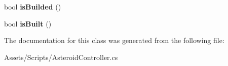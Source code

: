 \begin{DoxyCompactItemize}
\item 
\hypertarget{class_asteroid_controller_1_1_building_a90bee73e6b062d0fb2b78dd2a15725d6}{}bool {\bfseries is\+Builded} ()\label{class_asteroid_controller_1_1_building_a90bee73e6b062d0fb2b78dd2a15725d6}

\item 
\hypertarget{class_asteroid_controller_1_1_building_a8bb0b5b0fa1607d5882819de8383b63b}{}bool {\bfseries is\+Built} ()\label{class_asteroid_controller_1_1_building_a8bb0b5b0fa1607d5882819de8383b63b}

\end{DoxyCompactItemize}


The documentation for this class was generated from the following file\+:\begin{DoxyCompactItemize}
\item 
Assets/\+Scripts/Asteroid\+Controller.\+cs\end{DoxyCompactItemize}
